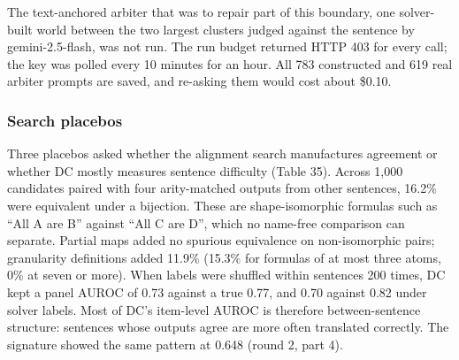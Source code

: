 \documentclass[11pt,letterpaper]{article}
\begin{document}
The text-anchored arbiter that was to repair part of this boundary, one solver-built world between the two largest clusters judged against the sentence by gemini-2.5-flash, was not run. The run budget returned HTTP 403 for every call; the key was polled every 10 minutes for an hour. All 783 constructed and 619 real arbiter prompts are saved, and re-asking them would cost about \$0.10.

\subsubsection{Search placebos}

Three placebos asked whether the alignment search manufactures agreement or whether DC mostly measures sentence difficulty (Table 35). Across 1,000 candidates paired with four arity-matched outputs from other sentences, 16.2\% were equivalent under a bijection. These are shape-isomorphic formulas such as ``All A are B'' against ``All C are D'', which no name-free comparison can separate. Partial maps added no spurious equivalence on non-isomorphic pairs; granularity definitions added 11.9\% (15.3\% for formulas of at most three atoms, 0\% at seven or more). When labels were shuffled within sentences 200 times, DC kept a panel AUROC of 0.73 against a true 0.77, and 0.70 against 0.82 under solver labels. Most of DC's item-level AUROC is therefore between-sentence structure: sentences whose outputs agree are more often translated correctly. The signature showed the same pattern at 0.648 (round 2, part 4).
\end{document}
